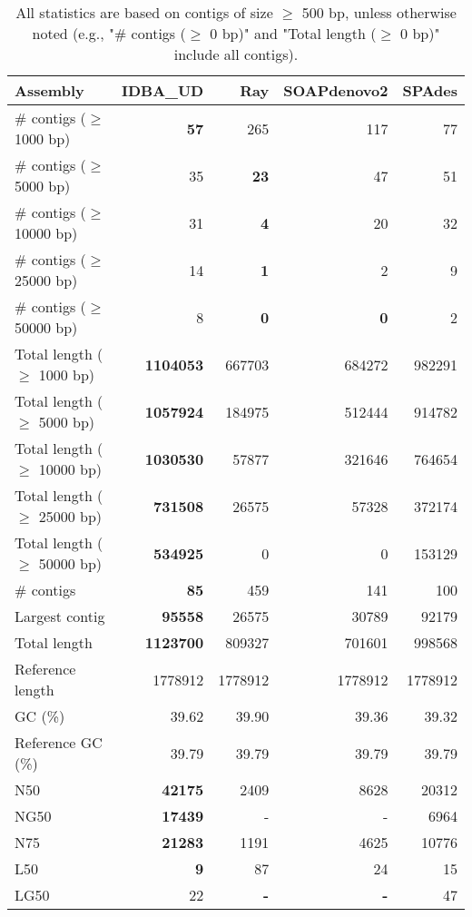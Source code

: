 \documentclass[12pt,a4paper]{article}
\begin{document}
\begin{table}[ht]
\begin{center}
\caption{All statistics are based on contigs of size $\geq$ 500 bp, unless otherwise noted (e.g., "\# contigs ($\geq$ 0 bp)" and "Total length ($\geq$ 0 bp)" include all contigs).}
\begin{tabular}{|l*{4}{|r}|}
\hline
Assembly & IDBA\_UD & Ray & SOAPdenovo2 & SPAdes \\ \hline
\# contigs ($\geq$ 1000 bp) & {\bf 57} & 265 & 117 & 77 \\ \hline
\# contigs ($\geq$ 5000 bp) & 35 & {\bf 23} & 47 & 51 \\ \hline
\# contigs ($\geq$ 10000 bp) & 31 & {\bf 4} & 20 & 32 \\ \hline
\# contigs ($\geq$ 25000 bp) & 14 & {\bf 1} & 2 & 9 \\ \hline
\# contigs ($\geq$ 50000 bp) & 8 & {\bf 0} & {\bf 0} & 2 \\ \hline
Total length ($\geq$ 1000 bp) & {\bf 1104053} & 667703 & 684272 & 982291 \\ \hline
Total length ($\geq$ 5000 bp) & {\bf 1057924} & 184975 & 512444 & 914782 \\ \hline
Total length ($\geq$ 10000 bp) & {\bf 1030530} & 57877 & 321646 & 764654 \\ \hline
Total length ($\geq$ 25000 bp) & {\bf 731508} & 26575 & 57328 & 372174 \\ \hline
Total length ($\geq$ 50000 bp) & {\bf 534925} & 0 & 0 & 153129 \\ \hline
\# contigs & {\bf 85} & 459 & 141 & 100 \\ \hline
Largest contig & {\bf 95558} & 26575 & 30789 & 92179 \\ \hline
Total length & {\bf 1123700} & 809327 & 701601 & 998568 \\ \hline
Reference length & 1778912 & 1778912 & 1778912 & 1778912 \\ \hline
GC (\%) & 39.62 & 39.90 & 39.36 & 39.32 \\ \hline
Reference GC (\%) & 39.79 & 39.79 & 39.79 & 39.79 \\ \hline
N50 & {\bf 42175} & 2409 & 8628 & 20312 \\ \hline
NG50 & {\bf 17439} & - & - & 6964 \\ \hline
N75 & {\bf 21283} & 1191 & 4625 & 10776 \\ \hline
L50 & {\bf 9} & 87 & 24 & 15 \\ \hline
LG50 & 22 & {\bf -} & {\bf -} & 47 \\ \hline

\end{tabular}
\end{center}
\end{table}
\end{document}
